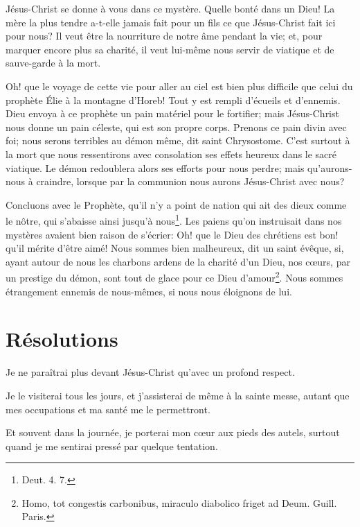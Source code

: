 \documentclass[instructions.tex]{subfiles}
\begin{document}
\tertio Jésus-Christ se donne à vous dans ce mystère.  Quelle bonté dans un Dieu! La mère la plus tendre a-t-elle jamais fait pour un fils ce que Jésus-Christ fait ici pour nous? Il veut être la nourriture de notre âme pendant la vie; et, pour marquer encore plus sa charité, il veut lui-même nous servir de viatique et de sauve-garde à la mort.

Oh! que le voyage de cette vie pour aller au ciel est bien plus difficile que celui du prophète Élie à la montagne d’Horeb! Tout y est rempli d’écueils et d’ennemis. Dieu envoya à ce prophète un pain matériel pour le fortifier; mais Jésus-Christ nous donne un pain céleste, qui est son propre corps. Prenons ce pain divin avec foi; nous serons terribles au démon même, dit saint Chrysostome. C’est surtout à la mort que nous ressentirons avec consolation ses effets heureux dans le sacré viatique. Le démon redoublera alors ses efforts pour nous perdre; mais qu’aurons-nous à craindre, lorsque par la communion nous aurons Jésus-Christ avec nous?

Concluons avec le Prophète, qu’il n’y a point de nation qui ait des dieux comme le nôtre, qui s’abaisse ainsi jusqu’à nous\footnote{Deut. 4. 7.}. Les paiens qu’on instruisait dans nos mystères avaient bien raison de s’écrier: Oh! que le Dieu des chrétiens est bon! qu’il mérite d’être aimé!  Nous sommes bien malheureux, dit un saint évêque, si, ayant autour de nous les charbons ardens de la charité d’un Dieu, nos cœurs, par un prestige du démon, sont tout de glace pour ce Dieu d’amour\footnote{Homo, tot congestis carbonibus, miraculo diabolico friget ad Deum. Guill. Paris.}. Nous sommes étrangement ennemis de nous-mêmes, si nous nous éloignons de lui.
 
\section{Résolutions}
 
\primo Je ne paraîtrai plus devant Jésus-Christ qu’avec un profond respect.

\secundo Je le visiterai tous les jours, et j’assisterai de même à la sainte messe, autant que mes occupations et ma santé me le permettront.

\tertio Et souvent dans la journée, je porterai mon cœur aux pieds des autels, surtout quand je me sentirai pressé par quelque tentation.

 
\end{document}
